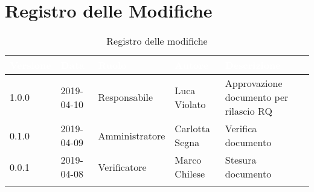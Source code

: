 \newpage

\section*{Registro delle Modifiche}

\begin{center}
\begin{longtable}[c]{|m{}|m{}|m{}|m{}|p{}|}
\hline
\rowcolor{bluelogo}\textbf{\textcolor{white}{Versione}} & \textbf{\textcolor{white}{Data}} & \textbf{\textcolor{white}{Ruolo}} & \textbf{\textcolor{white}{Autore}} & \textbf{\textcolor{white}{Descrizione}}\\
\hline \hline
\endfirsthead
1.0.0 & 2019-04-10 & Responsabile & Luca Violato & Approvazione documento per rilascio RQ \\
\hline
\rowcolor{grigio} 0.1.0 & 2019-04-09 & Amministratore & Carlotta Segna & Verifica documento \\
\hline
0.0.1 & 2019-04-08 & Verificatore & Marco Chilese & Stesura documento \\
\hline
\caption{Registro delle modifiche}
\end{longtable}
\end{center}
